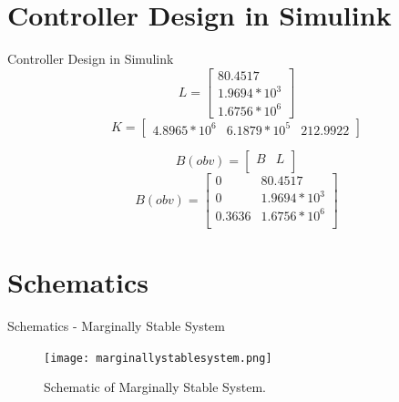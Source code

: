 \documentclass[10pt,compress,mathserif]{beamer}
\begin{document}
\section{Controller Design in Simulink}
\begin{frame}{Controller Design in Simulink}
\begin{equation}
L = \begin{bmatrix}
80.4517 \\
1.9694 * 10^3 \\
1.6756 * 10^6 \end{bmatrix}
\end{equation}
\begin{equation}
K = 
\begin{bmatrix}
4.8965*10^6 & 6.1879*10^5 & 212.9922 
\end{bmatrix}
\end{equation}

\begin{equation}
B(obv) = 
\begin{bmatrix}
B & L \\
\end{bmatrix}
\end{equation}
\begin{equation}
B(obv) = 
\begin{bmatrix}
0 & 80.4517\\
0 & 1.9694 * 10^3\\
0.3636 & 1.6756* 10^6\\\end{bmatrix}
\end{equation}

\end{frame}


\section{Schematics}
\begin{frame}{Schematics - Marginally Stable System}
\vskip10pt
\begin{figure}[h!]
\centering
\texttt{[image: marginallystablesystem.png]}
\caption{Schematic of Marginally Stable System.}
\end{figure}




\end{frame}
\end{document}
